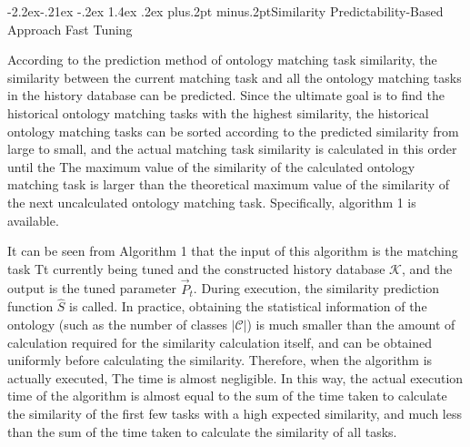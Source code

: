 \documentclass[twoside]{article}
\makeatletter
\def\subsubsection{\@startsection{subsubsection}{3}{\z@}%
 {-2.2ex\@plus -.21ex \@minus -.2ex}%
 {1.4ex \@plus.2ex}
{\normalfont\normalsize\protect\baselineskip=12pt plus.2pt minus.2pt\sl}}
\makeatother
\begin{document}
\subsubsection{Similarity Predictability-Based Approach Fast Tuning}

According to the prediction method of ontology matching task similarity, the similarity between the current matching task and all the ontology matching tasks in the history database can be predicted.
Since the ultimate goal is to find the historical ontology matching tasks with the highest similarity, the historical ontology matching tasks can be sorted according to the predicted similarity from large to small, and the actual matching task similarity is calculated in this order until the The maximum value of the similarity of the calculated ontology matching task is larger than the theoretical maximum value of the similarity of the next uncalculated ontology matching task.
Specifically, algorithm 1 is available.

It can be seen from Algorithm 1 that the input of this algorithm is the matching task Tt currently being tuned and the constructed history database $\mathcal{K}$, and the output is the tuned parameter $\vec{P}_{t}$. During execution, the similarity prediction function $\hat{S}$ is called. In practice, obtaining the statistical information of the ontology (such as the number of classes $\left|\mathcal{C}\right|$) is much smaller than the amount of calculation required for the similarity calculation itself, and can be obtained uniformly before calculating the similarity. Therefore, when the algorithm is actually executed, The time is almost negligible. In this way, the actual execution time of the algorithm is almost equal to the sum of the time taken to calculate the similarity of the first few tasks with a high expected similarity, and much less than the sum of the time taken to calculate the similarity of all tasks.

\noindent
{}
\end{document}
